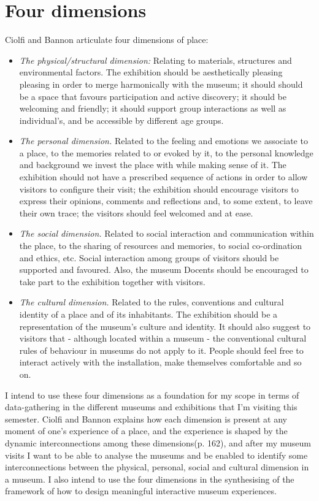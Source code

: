 \section{Four dimensions}

\par
Ciolfi and Bannon articulate four dimensions of place:
\begin{itemize}
  \item \emph{The physical/structural dimension:} Relating to materials, structures and environmental factors. The exhibition should be aesthetically pleasing pleasing in order to merge harmonically with the museum; it should should be a space that favours participation and active discovery; it should be welcoming and friendly; it should support group interactions as well as individual's, and be accessible by different age groups.
  \item \emph{The personal dimension.} Related to the feeling and emotions we associate to a place, to the memories related to or evoked by it, to the personal knowledge and background we invest the place with while making sense of it. The exhibition should not have a prescribed sequence of actions in order to allow visitors to configure their visit; the exhibition should encourage visitors to express their opinions, comments and reflections and, to some extent, to leave their own trace; the visitors should feel welcomed and at ease. 
  \item \emph{The social dimension.} Related to social interaction and communication within the place, to the sharing of resources and memories, to social co-ordination and ethics, etc. Social interaction among groups of visitors should be supported and favoured. Also, the museum Docents should be encouraged to take part to the exhibition together with visitors.
  \item \emph{The cultural dimension.} Related to the rules, conventions and cultural identity of a place and of its inhabitants. The exhibition should be a representation of the museum's culture and identity. It should also suggest to visitors that - although located within a museum - the conventional cultural rules of behaviour in museums do not apply to it. People should feel free to interact actively with the installation, make themselves comfortable and so on.
\end{itemize}

I intend to use these four dimensions as a foundation for my scope in terms of data-gathering in the different museums and exhibitions that I’m visiting this semester. Ciolfi and Bannon explains how each dimension is present at any moment of one’s experience of a place, and the experience is shaped by the dynamic interconnections among these dimensions(p. 162), and after my museum visits I want to be able to analyse the museums and be enabled to identify some interconnections between the physical, personal, social and cultural dimension in a museum. I also intend to use the four dimensions in the synthesising of the framework of how to design meaningful interactive museum experiences.

